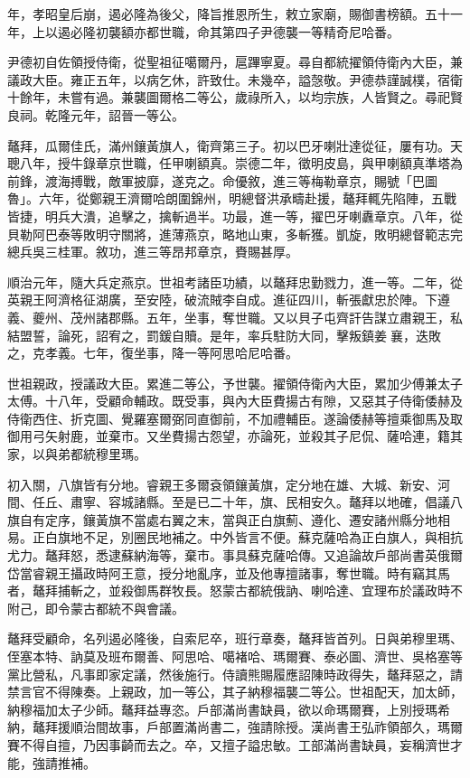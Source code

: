 \begin{pinyinscope}
年，孝昭皇后崩，遏必隆為後父，降旨推恩所生，敕立家廟，賜御書榜額。五十一年，上以遏必隆初襲額亦都世職，命其第四子尹德襲一等精奇尼哈番。

尹德初自佐領授侍衛，從聖祖征噶爾丹，扈蹕寧夏。尋自都統擢領侍衛內大臣，兼議政大臣。雍正五年，以病乞休，許致仕。未幾卒，謚愨敬。尹德恭謹誠樸，宿衛十餘年，未嘗有過。兼襲圖爾格二等公，歲祿所入，以均宗族，人皆賢之。尋祀賢良祠。乾隆元年，詔晉一等公。

鼇拜，瓜爾佳氏，滿州鑲黃旗人，衛齊第三子。初以巴牙喇壯達從征，屢有功。天聰八年，授牛錄章京世職，任甲喇額真。崇德二年，徵明皮島，與甲喇額真準塔為前鋒，渡海搏戰，敵軍披靡，遂克之。命優敘，進三等梅勒章京，賜號「巴圖魯」。六年，從鄭親王濟爾哈朗圍錦州，明總督洪承疇赴援，鼇拜輒先陷陣，五戰皆捷，明兵大潰，追擊之，擒斬過半。功最，進一等，擢巴牙喇纛章京。八年，從貝勒阿巴泰等敗明守關將，進薄燕京，略地山東，多斬獲。凱旋，敗明總督範志完總兵吳三桂軍。敘功，進三等昂邦章京，賚賜甚厚。

順治元年，隨大兵定燕京。世祖考諸臣功績，以鼇拜忠勤戮力，進一等。二年，從英親王阿濟格征湖廣，至安陸，破流賊李自成。進征四川，斬張獻忠於陣。下遵義、夔州、茂州諸郡縣。五年，坐事，奪世職。又以貝子屯齊訐告謀立肅親王，私結盟誓，論死，詔宥之，罰鍰自贖。是年，率兵駐防大同，擊叛鎮姜襄，迭敗之，克孝義。七年，復坐事，降一等阿思哈尼哈番。

世祖親政，授議政大臣。累進二等公，予世襲。擢領侍衛內大臣，累加少傅兼太子太傅。十八年，受顧命輔政。既受事，與內大臣費揚古有隙，又惡其子侍衛倭赫及侍衛西住、折克圖、覺羅塞爾弼同直御前，不加禮輔臣。遂論倭赫等擅乘御馬及取御用弓矢射鹿，並棄市。又坐費揚古怨望，亦論死，並殺其子尼侃、薩哈連，籍其家，以與弟都統穆里瑪。

初入關，八旗皆有分地。睿親王多爾袞領鑲黃旗，定分地在雄、大城、新安、河間、任丘、肅寧、容城諸縣。至是已二十年，旗、民相安久。鼇拜以地確，倡議八旗自有定序，鑲黃旗不當處右翼之末，當與正白旗薊、遵化、遷安諸州縣分地相易。正白旗地不足，別圈民地補之。中外皆言不便。蘇克薩哈為正白旗人，與相抗尤力。鼇拜怒，悉逮蘇納海等，棄市。事具蘇克薩哈傳。又追論故戶部尚書英俄爾岱當睿親王攝政時阿王意，授分地亂序，並及他專擅諸事，奪世職。時有竊其馬者，鼇拜捕斬之，並殺御馬群牧長。怒蒙古都統俄訥、喇哈達、宜理布於議政時不附己，即令蒙古都統不與會議。

鼇拜受顧命，名列遏必隆後，自索尼卒，班行章奏，鼇拜皆首列。日與弟穆里瑪、侄塞本特、訥莫及班布爾善、阿思哈、噶褚哈、瑪爾賽、泰必圖、濟世、吳格塞等黨比營私，凡事即家定議，然後施行。侍讀熊賜履應詔陳時政得失，鼇拜惡之，請禁言官不得陳奏。上親政，加一等公，其子納穆福襲二等公。世祖配天，加太師，納穆福加太子少師。鼇拜益專恣。戶部滿尚書缺員，欲以命瑪爾賽，上別授瑪希納，鼇拜援順治間故事，戶部置滿尚書二，強請除授。漢尚書王弘祚領部久，瑪爾賽不得自擅，乃因事齮而去之。卒，又擅子謚忠敏。工部滿尚書缺員，妄稱濟世才能，強請推補。


\end{pinyinscope}
